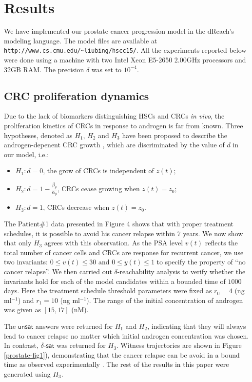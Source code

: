 \section{Results}\label{sec.results}

We have implemented our prostate cancer progression model in the dReach's modeling language. The model files are available at \verb#http://www.cs.cmu.edu/~liubing/hscc15/#. All the experiments reported below were done using a machine with two Intel Xeon E5-2650 2.00GHz processors and 32GB RAM. The precision $\delta$ was set to $10^{-4}$. 

\subsection{CRC proliferation dynamics}
Due to the lack of biomarkers distinguishing HSCs and CRCs \textit{in vivo}, the proliferation kinetics of CRCs in response to androgen is far from known. Three hypotheses, denoted as $H_1$, $H_2$ and $H_3$ have been proposed to describe the androgen-depenent CRC growth  \cite{ideta08}, which are discriminated by the value of $d$ in our model, i.e.:
\begin{itemize}
\item $H_1: d = 0$, the grow of CRCs is independent of $z(t)$;
\item $H_2: d = 1-\frac{\beta_y}{\alpha_y}$, CRCs cease growing when $z(t)=z_0$;
\item $H_3: d = 1$, CRCs decrease when $z(t)=z_0$.
\end{itemize} 

The Patient\#1 data presented in Figure 4 shows that with proper treatment schedules, it is possible to avoid his cancer relapse within $7$ years. We now show that only $H_3$ agrees with this observation. As the PSA level $v(t)$ reflects the total number of cancer cells and CRCs are response for recurrent cancer, we use two invariants: $0 \le v(t) \le 30$ and $0 \le y(t) \le 1$ to specify the property of ``no cancer relapse''. We then carried out $\delta$-reachability analysis to verify whether the invariants hold for each of the model candidates within a bounded time of $1000$ days. Here the treatment schedule threshold parameters were fixed as $r_0=4$ (ng ml$^{-1}$) and $r_1=10$ (ng ml$^{-1}$). The range of the initial concentration of androgen was given as $[15, 17]$ (nM).

The $\mathsf{unsat}$ answers were returned for $H_1$ and $H_2$, indicating that they will always lead to cancer relapse no matter which initial androgen concentration was chosen. In contrast, $\delta$-$\mathsf{sat}$ was returned for $H_3$. Witness trajectories are shown in Figure \ref{prostate-fig1}), demonstrating that the cancer relapse can be avoid in a bound time as observed experimentally \cite{ bruchovsky06,bruchovsky07}. The rest of the results in this paper were generated using $H_3$.

